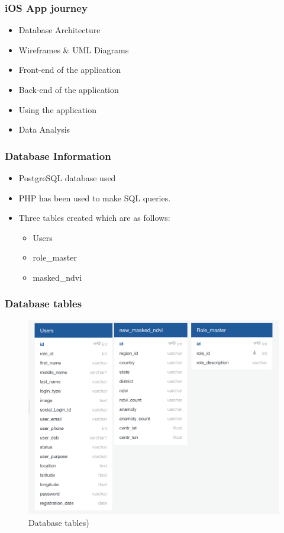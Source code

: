 \begin{frame}
\frametitle{iOS App journey}
\begin{itemize}
    \item Database Architecture 
    \item Wireframes \& UML Diagrams
    \item Front-end of the application
    \item Back-end of the application
    \item Using the application
    \item Data Analysis
\end{itemize}
\end{frame}

\begin{frame}
\frametitle{Database Information}
\begin{itemize}
    \item PostgreSQL database used
    \item PHP has been used to make SQL queries.
    \item Three tables created which are as follows:
    
    \begin{itemize}
        \item Users
        \item role\_master
        \item masked\_ndvi
    \end{itemize}
    
\end{itemize}
\end{frame}

\begin{frame}
\frametitle{Database tables}
\begin{figure}
    \centering
    \begin{minipage}{0.75\columnwidth}
    \includegraphics[width=\linewidth]{final/figures/database_structure.png}
    \caption{\tiny{Database tables)}}
    \end{minipage}
\end{figure}
\end{frame}




